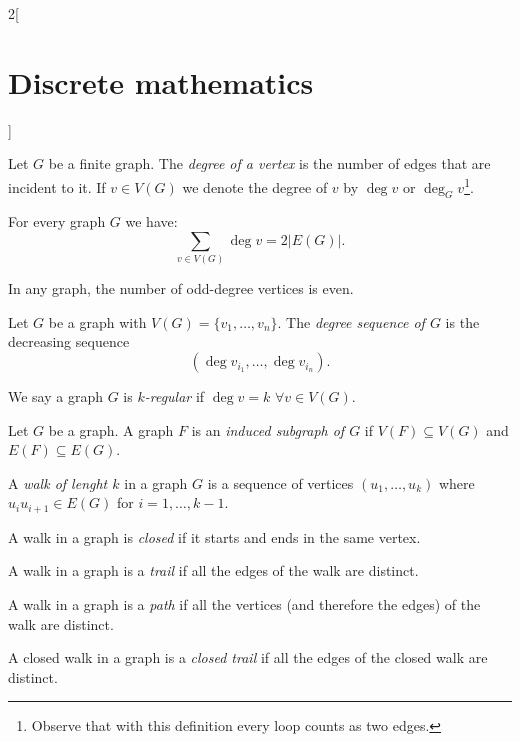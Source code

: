 \documentclass[../../../main.tex]{subfiles}
\begin{document}
\begin{multicols}{2}[\section{Discrete mathematics}]
\begin{definition}
\end{definition}
\begin{definition}
Let $G$ be a finite graph. The \textit{degree of a vertex} is the number of edges that are incident to it. If $v\in V(G)$ we denote the degree of $v$ by $\deg v$ or $\deg_Gv$\footnote{Observe that with this definition every loop counts as two edges.}.
\end{definition}
\begin{lemma}
For every graph $G$ we have: $$\sum_{v\in V(G)}\deg v=2|E(G)|.$$
\end{lemma}
\begin{corollary}
In any graph, the number of odd-degree vertices is even.
\end{corollary}
\begin{definition}
Let $G$ be a graph with $V(G)=\{v_1,\ldots,v_n\}$. The \textit{degree sequence of $G$} is the decreasing sequence $$(\deg v_{i_1},\ldots,\deg v_{i_n}).$$
\end{definition}
\begin{definition}
We say a graph $G$ is \textit{$k$-regular} if $\deg v=k$ $\forall v\in V(G)$.
\end{definition}
\begin{definition}
Let $G$ be a graph. A graph $F$ is an \textit{induced subgraph of $G$} if $V(F)\subseteq V(G)$ and $E(F)\subseteq E(G)$.
\end{definition}
\begin{definition}
A \textit{walk of lenght $k$} in a graph $G$ is a sequence of vertices $(u_1,\ldots,u_k)$ where $u_iu_{i+1}\in E(G)$ for $i=1,\ldots,k-1$.
\end{definition}
\begin{definition}
A walk in a graph is \textit{closed} if it starts and ends in the same vertex.
\end{definition}
\begin{definition}
A walk in a graph is a \textit{trail} if all the edges of the walk are distinct.
\end{definition}
\begin{definition}
A walk in a graph is a \textit{path} if all the vertices (and therefore the edges) of the walk are distinct.
\end{definition}
\begin{definition}
A closed walk in a graph is a \textit{closed trail} if all the edges of the closed walk are distinct.
\end{definition}
\begin{definition}

\end{definition}
\end{multicols}
\end{document}
